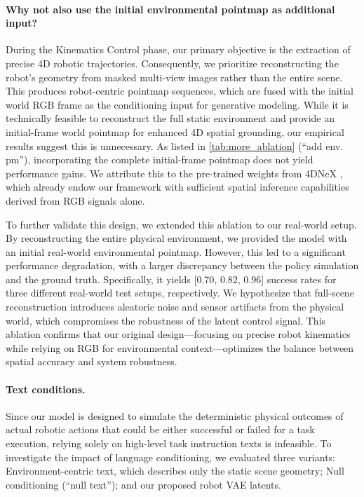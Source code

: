 \begin{appendices}
\paragraph{Why not also use the initial environmental pointmap as additional input?}
During the Kinematics Control phase, our primary objective is the extraction of precise 4D robotic trajectories. Consequently, we prioritize reconstructing the robot's geometry from masked multi-view images rather than the entire scene. This produces robot-centric pointmap sequences, which are fused with the initial world RGB frame as the conditioning input for generative modeling. While it is technically feasible to reconstruct the full static environment and provide an initial-frame world pointmap for enhanced 4D spatial grounding, our empirical results suggest this is unnecessary.
As listed in \cref{tab:more_ablation} (“add env. pm”), incorporating the complete initial-frame pointmap does not yield performance gains. We attribute this to the pre-trained weights from 4DNeX \cite{chen20254dnex}, which already endow our framework with sufficient spatial inference capabilities derived from RGB signals alone.

To further validate this design, we extended this ablation to our real-world setup. By reconstructing the entire physical environment, we provided the model with an initial real-world environmental pointmap. However, this led to a significant performance degradation, with a larger discrepancy between the policy simulation and the ground truth. Specifically, it yields [0.70, 0.82, 0.96] success rates for three different real-world test setups, respectively.
We hypothesize that full-scene reconstruction introduces aleatoric noise and sensor artifacts from the physical world, which compromises the robustness of the latent control signal. This ablation confirms that our original design—focusing on precise robot kinematics while relying on RGB for environmental context—optimizes the balance between spatial accuracy and system robustness.

\paragraph{Text conditions.}
Since our model is designed to simulate the deterministic physical outcomes of actual robotic actions that could be either successful or failed for a task execution, relying solely on high-level task instruction texts is infeasible. To investigate the impact of language conditioning, we evaluated three variants: Environment-centric text, which describes only the static scene geometry; Null conditioning (“null text”); and our proposed robot VAE latents.


\end{appendices}
